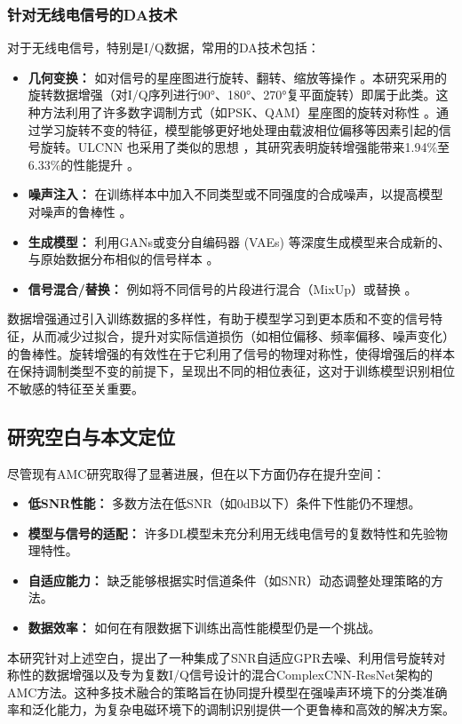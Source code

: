 \documentclass[conference]{IEEEtran}
\begin{document}
\subsubsection{针对无线电信号的DA技术}
对于无线电信号，特别是I/Q数据，常用的DA技术包括：
\begin{itemize}
    \item \textbf{几何变换：} 如对信号的星座图进行旋转、翻转、缩放等操作 \cite{[19]}\cite{[49]}\cite{[57]}\cite{[58]}\cite{[59]}。本研究采用的旋转数据增强（对I/Q序列进行90°、180°、270°复平面旋转）即属于此类。这种方法利用了许多数字调制方式（如PSK、QAM）星座图的旋转对称性 \cite{}。通过学习旋转不变的特征，模型能够更好地处理由载波相位偏移等因素引起的信号旋转。ULCNN \cite{b1} 也采用了类似的思想 \cite{[23]}\cite{[48]}，其研究表明旋转增强能带来1.94\%至6.33\%的性能提升 \cite{[48]}。
    \item \textbf{噪声注入：} 在训练样本中加入不同类型或不同强度的合成噪声，以提高模型对噪声的鲁棒性 \cite{[59]}。
    \item \textbf{生成模型：} 利用GANs或变分自编码器 (VAEs) 等深度生成模型来合成新的、与原始数据分布相似的信号样本 \cite{[19]}\cite{[51]}\cite{[60]}。
    \item \textbf{信号混合/替换：} 例如将不同信号的片段进行混合（MixUp）或替换 \cite{[60]}\cite{[61]}。
\end{itemize}
数据增强通过引入训练数据的多样性，有助于模型学习到更本质和不变的信号特征，从而减少过拟合，提升对实际信道损伤（如相位偏移、频率偏移、噪声变化）的鲁棒性。旋转增强的有效性在于它利用了信号的物理对称性，使得增强后的样本在保持调制类型不变的前提下，呈现出不同的相位表征，这对于训练模型识别相位不敏感的特征至关重要。

\subsection{研究空白与本文定位}
尽管现有AMC研究取得了显著进展，但在以下方面仍存在提升空间：
\begin{itemize}
    \item \textbf{低SNR性能：} 多数方法在低SNR（如0dB以下）条件下性能仍不理想。
    \item \textbf{模型与信号的适配：} 许多DL模型未充分利用无线电信号的复数特性和先验物理特性。
    \item \textbf{自适应能力：} 缺乏能够根据实时信道条件（如SNR）动态调整处理策略的方法。
    \item \textbf{数据效率：} 如何在有限数据下训练出高性能模型仍是一个挑战。
\end{itemize}
本研究针对上述空白，提出了一种集成了SNR自适应GPR去噪、利用信号旋转对称性的数据增强以及专为复数I/Q信号设计的混合ComplexCNN-ResNet架构的AMC方法。这种多技术融合的策略旨在协同提升模型在强噪声环境下的分类准确率和泛化能力，为复杂电磁环境下的调制识别提供一个更鲁棒和高效的解决方案。
\end{document}
